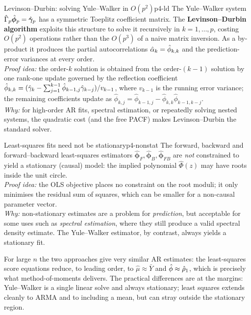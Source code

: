 \begin{proposition}{Levinson--Durbin: solving Yule--Walker in $O(p^2)$}{p4-ld}
The Yule--Walker system
$\hat\Gamma_p\hat{\boldsymbol\phi}_p=\hat{\boldsymbol{\gamma}}_p$ has a symmetric
Toeplitz coefficient matrix. The \textbf{Levinson--Durbin algorithm} exploits
this structure to solve it recursively in $k=1,\dots,p$, costing $O(p^2)$
operations rather than the $O(p^3)$ of a naive matrix inversion. As a
by-product it produces the partial autocorrelations
$\hat{\alpha}_k=\hat\phi_{k,k}$ and the prediction-error variances at every order.\\[2pt]
\textit{Proof idea:} the order-$k$ solution is obtained from the order-$(k-1)$
solution by one rank-one update governed by the reflection coefficient
$\hat\phi_{k,k}=(\hat{\gamma}_k-\sum_{j=1}^{k-1}\hat\phi_{k-1,j}\hat{\gamma}_{k-j})/
v_{k-1}$, where $v_{k-1}$ is the running error variance; the remaining
coefficients update as
$\hat\phi_{k,j}=\hat\phi_{k-1,j}-\hat\phi_{k,k}\hat\phi_{k-1,k-j}$.\\
\textit{Why:} for high-order AR fits, spectral estimation, or repeatedly
solving nested systems, the quadratic cost (and the free PACF) makes
Levinson--Durbin the standard solver.
\end{proposition}

\begin{proposition}{Least-squares fits need not be stationary}{p4-nonstat}
The forward, backward and forward--backward least-squares estimators
$\hat{\boldsymbol\phi}_F,\hat{\boldsymbol\phi}_B,\hat{\boldsymbol\phi}_{FB}$ are
\emph{not} constrained to yield a stationary (causal) model: the implied
polynomial $\hat\Phi(z)$ may have roots inside the unit circle.\\[2pt]
\textit{Proof idea:} the OLS objective places no constraint on the root moduli;
it only minimises the residual sum of squares, which can be smaller for a
non-causal parameter vector.\\
\textit{Why:} non-stationary estimates are a problem for \emph{prediction}, but
acceptable for some uses such as \emph{spectral estimation}, where they still
produce a valid spectral density estimate. The Yule--Walker estimator, by
contrast, always yields a stationary fit.
\end{proposition}

\begin{intuition}
For large $n$ the two approaches give very similar AR estimates: the
least-squares score equations reduce, to leading order, to
$\hat\mu\approx\bar Y$ and $\hat\phi\approx\hat{\rho}_1$, which is precisely what
method-of-moments delivers. The practical differences are at the margins:
Yule--Walker is a single linear solve and always stationary; least squares
extends cleanly to ARMA and to including a mean, but can stray outside the
stationary region.
\end{intuition}


